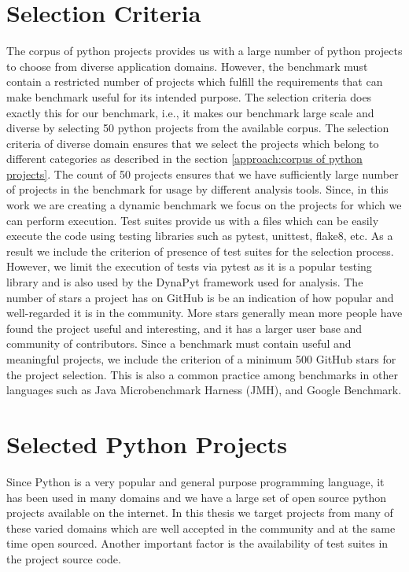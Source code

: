 \section{Selection Criteria}
\label{approach:selection criteria}
The corpus of python projects provides us with a large number of python projects to choose from diverse application domains. However, the benchmark must contain a restricted number of projects which fulfill the requirements that can make benchmark useful for its intended purpose. The selection criteria does exactly this for our benchmark, i.e., it makes our benchmark large scale and diverse by selecting 50 python projects from the available corpus. The selection criteria of diverse domain ensures that we select the projects which belong to different categories as described in the section \ref{approach:corpus of python projects}. The count of 50 projects ensures that we have sufficiently large number of projects in the benchmark for usage by different analysis tools. Since, in this work we are creating a dynamic benchmark we focus on the projects for which we can perform execution. Test suites provide us with a files which can be easily execute the code using testing libraries such as pytest, unittest, flake8, etc. As a result we include the criterion of presence of test suites for the selection process. However, we limit the execution of tests via pytest as it is a popular testing library and is also used by the DynaPyt framework used for analysis. The number of stars a project has on GitHub is be an indication of how popular and well-regarded it is in the community. More stars generally mean more people have found the project useful and interesting, and it has a larger user base and community of contributors. Since a benchmark must contain useful and meaningful projects, we include the criterion of a minimum 500 GitHub stars for the project selection. This is also a common practice among benchmarks in other languages such as Java Microbenchmark Harness (JMH), and Google Benchmark. 

\section{Selected Python Projects}
\label{approach:selection of projects}
Since Python is a very popular and general purpose programming language, it has been used in many domains and we have a large set of open source python projects available on the internet. In this thesis we target projects from many of these varied domains which are well accepted in the community and at the same time open sourced. Another important factor is the availability of test suites in the project source code. 

